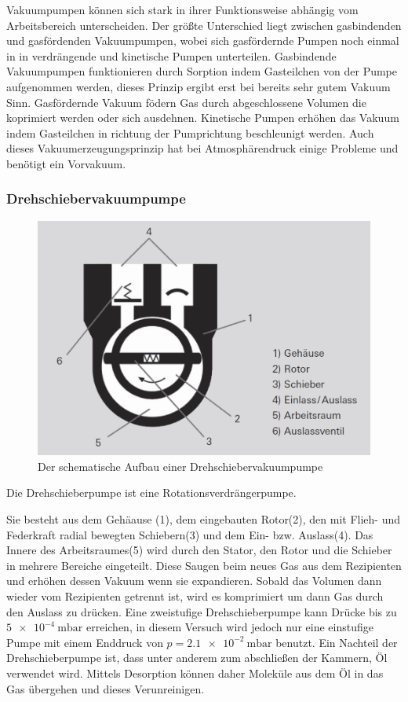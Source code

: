 			\noindent
		Vakuumpumpen können sich stark in ihrer Funktionsweise abhängig vom Arbeitsbereich unterscheiden.		
		Der größte Unterschied liegt zwischen gasbindenden und gasfördenden Vakuumpumpen, wobei sich gasfördernde Pumpen noch einmal in in verdrängende und kinetische Pumpen unterteilen.
		Gasbindende Vakuumpumpen funktionieren durch Sorption indem Gasteilchen von der Pumpe aufgenommen werden, dieses Prinzip ergibt erst bei bereits sehr gutem Vakuum Sinn.  Gasfördernde Vakuum födern Gas durch abgeschlossene Volumen die koprimiert werden oder sich ausdehnen.
		Kinetische Pumpen erhöhen das Vakuum indem Gasteilchen in richtung der Pumprichtung beschleunigt werden.
		Auch dieses Vakuumerzeugungsprinzip hat bei Atmosphärendruck einige Probleme und benötigt ein Vorvakuum.

		\subsubsection{Drehschiebervakuumpumpe} 
						
			\begin{figure}
				\centering
				\includegraphics[width=0.5\linewidth]{"latex/images/Drehschieber.png"}
				\caption{Der schematische Aufbau einer Drehschiebervakuumpumpe}
				\label{fig:dreh}
			\end{figure} Die Drehschieberpumpe ist eine Rotationsverdrängerpumpe. 

			\noindent	
			Sie besteht aus dem Gehäause (1), dem eingebauten Rotor(2), den mit Flieh- und Federkraft radial bewegten Schiebern(3) und dem Ein- bzw. Auslass(4). 
			Das Innere des Arbeitsraumes(5) wird durch den Stator, den Rotor und die Schieber in mehrere Bereiche eingeteilt. 
			Diese Saugen beim neues Gas aus dem Rezipienten und erhöhen dessen Vakuum wenn sie expandieren.
			Sobald das Volumen dann wieder vom Rezipienten getrennt ist, wird es komprimiert um dann Gas durch den Auslass zu drücken.
			Eine zweistufige Drehschieberpumpe kann Drücke bis zu $\SI{5e-4}{\milli\bar}$ erreichen, in diesem Versuch wird jedoch nur eine einstufige Pumpe mit einem Enddruck von $p = \SI{2.1 e-2}{\milli\bar}$ benutzt.
			Ein Nachteil der Drehschieberpumpe ist, dass unter anderem zum abschließen der Kammern, Öl verwendet wird.
			Mittels Desorption können daher Moleküle aus dem Öl in das Gas übergehen und dieses Verunreinigen.	 

